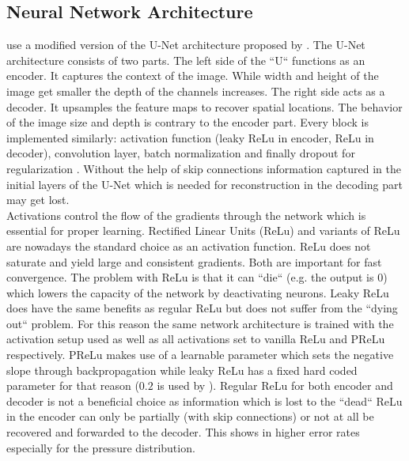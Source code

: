 \documentclass[acmtog]{techreportacmart}
\begin{document}
\subsection{Neural Network Architecture}
\cite{Thuerey20} use a modified version of the U-Net architecture proposed by \cite{ronneberger2015}. 
The U-Net architecture consists of two parts. The left side of the ``U`` functions as an encoder. 
It captures the context of the image. While width and height of the image get smaller the depth 
of the channels increases. The right side acts as a decoder. It upsamples the feature maps to 
recover spatial locations. The behavior of the image size and depth is contrary to the encoder 
part. Every block is implemented similarly: activation function (leaky ReLu in encoder, ReLu in 
decoder), convolution layer, batch normalization and finally dropout for regularization \cite{Thuerey20}. 
Without the help of skip connections information captured in the initial layers of the U-Net 
which is needed for reconstruction in the decoding part may get lost.\\ 
Activations control the flow of the gradients through the network which is essential for proper learning.
Rectified Linear Units (ReLu) and variants of ReLu are nowadays the standard choice as an activation function. 
ReLu does not saturate and yield large and consistent gradients. Both are important for fast convergence. 
The problem with ReLu is that it can ``die`` (e.g. the output is 0) which lowers the capacity of the 
network by deactivating neurons.
Leaky ReLu does have the same benefits as regular ReLu but does not suffer from the ``dying out`` problem. 
For this reason the same network architecture is trained with the activation setup \cite{Thuerey20} 
used as well as all activations set to vanilla ReLu and PReLu respectively. 
PReLu makes use of a learnable parameter which sets the negative slope through 
backpropagation while leaky ReLu has a fixed hard coded parameter for that reason ($0.2$ is used 
by \cite{Thuerey20}). 
Regular ReLu for both encoder and decoder is not a beneficial choice as information which is lost to 
the ``dead`` ReLu in the encoder can only be partially (with skip connections) or not at all be recovered 
and forwarded to the decoder. This shows in higher error rates especially for the pressure distribution.
\end{document}
